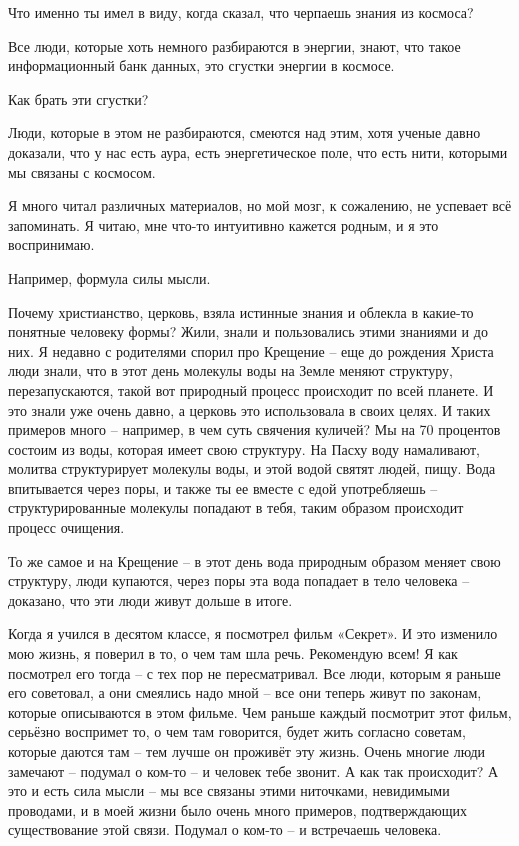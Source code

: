 Что именно ты имел в виду, когда сказал, что черпаешь знания из космоса?

Все люди, которые хоть немного разбираются в энергии, знают, что такое
информационный банк данных, это сгустки энергии в космосе.

Как брать эти сгустки?

Люди, которые в этом не разбираются, смеются над этим, хотя ученые давно
доказали, что у нас есть аура, есть энергетическое поле, что есть нити,
которыми мы связаны с космосом. 

Я много читал различных материалов, но мой мозг, к сожалению, не успевает всё
запоминать. Я читаю, мне что-то интуитивно кажется родным, и я это воспринимаю.

Например, формула силы мысли.

Почему христианство, церковь, взяла истинные знания и облекла в какие-то
понятные человеку формы? Жили, знали и пользовались этими знаниями и до них. Я
недавно с родителями спорил про Крещение – еще до рождения Христа люди знали,
что в этот день молекулы воды на Земле меняют структуру, перезапускаются, такой
вот природный процесс происходит по всей планете. И это знали уже очень давно,
а церковь это использовала в своих целях. И таких примеров много – например, в
чем суть свячения куличей? Мы на 70 процентов состоим из воды, которая имеет
свою структуру. На Пасху воду намаливают, молитва структурирует молекулы воды,
и этой водой святят людей, пищу. Вода впитывается через поры, и также ты ее
вместе с едой употребляешь – структурированные молекулы попадают в тебя, таким
образом происходит процесс очищения.

То же самое и на Крещение – в этот день вода природным образом меняет свою
структуру, люди купаются, через поры эта вода попадает в тело человека –
доказано, что эти люди живут дольше в итоге.

Когда я учился в десятом классе, я посмотрел фильм «Секрет». И это изменило мою
жизнь, я поверил в то, о чем там шла речь. Рекомендую всем! Я как посмотрел его
тогда – с тех пор не пересматривал. Все люди, которым я раньше его советовал, а
они смеялись надо мной – все они теперь живут по законам, которые описываются в
этом фильме. Чем раньше каждый посмотрит этот фильм, серьёзно воспримет то, о
чем там говорится, будет жить согласно советам, которые даются там – тем лучше
он проживёт эту жизнь. Очень многие люди замечают – подумал о ком-то – и
человек тебе звонит. А как так происходит? А это и есть сила мысли – мы все
связаны этими ниточками, невидимыми проводами, и в моей жизни было очень много
примеров, подтверждающих существование этой связи. Подумал о ком-то – и
встречаешь человека.

